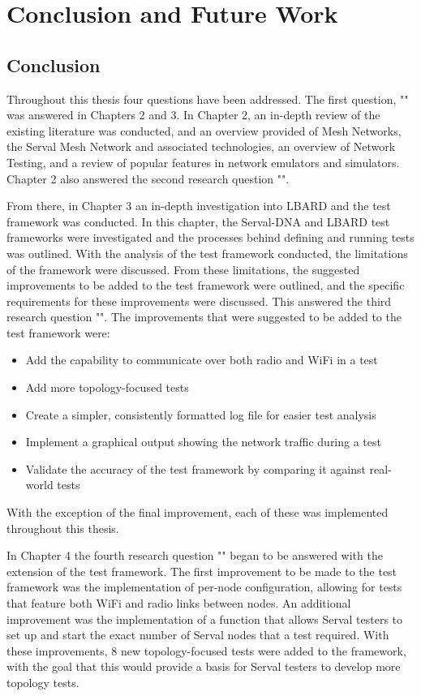 
\chapter{Conclusion and Future Work} %

\label{Chapter8}

\section{Conclusion}
Throughout this thesis four questions have been addressed.
The first question, "\firstRQ" was answered in Chapters 2 and 3.
In Chapter 2, an in-depth review of the existing literature was conducted, and an overview provided of Mesh Networks, the Serval Mesh Network and associated technologies, an overview of Network Testing, and a review of popular features in network emulators and simulators.
Chapter 2 also answered the second research question "\secondRQ".

From there, in Chapter 3 an in-depth investigation into LBARD and the test framework was conducted.
In this chapter, the Serval-DNA and LBARD test frameworks were investigated and the processes behind defining and running tests was outlined. 
With the analysis of the test framework conducted, the limitations of the framework were discussed.
From these limitations, the suggested improvements to be added to the test framework were outlined, and the specific requirements for these improvements were discussed.
This answered the third research question "\thirdRQ".
The improvements that were suggested to be added to the test framework were:
\begin{itemize}
    \item Add the capability to communicate over both radio and WiFi in a test
    \item Add more topology-focused tests
    \item Create a simpler, consistently formatted log file for easier test analysis
    \item Implement a graphical output showing the network traffic during a test
    \item Validate the accuracy of the test framework by comparing it against real-world tests
\end{itemize}
With the exception of the final improvement, each of these was implemented throughout this thesis.

In Chapter 4 the fourth research question "\fourthRQ" began to be answered with the extension of the test framework.
The first improvement to be made to the test framework was the implementation of per-node configuration, allowing for tests that feature both WiFi and radio links between nodes.
An additional improvement was the implementation of a function that allows Serval testers to set up and start the exact number of Serval nodes that a test required.
With these improvements, 8 new topology-focused tests were added to the framework, with the goal that this would provide a basis for Serval testers to develop more topology tests.

